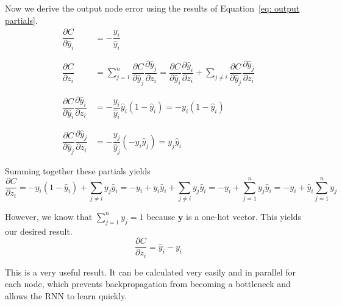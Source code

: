 \documentclass[pageno]{final_paper}
\begin{document}
Now we derive the output node error using the results of Equation~\eqref{eq: output partials}.
\begin{equation}
    \label{eq: loss function partial to h}
    \begin{aligned}
        \dfrac{\partial C}{\partial \hat{y}_i} &= -\dfrac{y_i}{\hat{y}_i} \\
        &\phantom{=} \\
        \dfrac{\partial C}{\partial z_i} &= \sum\limits_{j=1}^n \dfrac{\partial C}{\partial \hat{y}_j}\dfrac{\partial \hat{y}_j}{\partial z_i} =
            \dfrac{\partial C}{\partial \hat{y}_i}\dfrac{\partial \hat{y}_i}{\partial z_i} + \sum\limits_{j\neq i} \dfrac{\partial C}{\partial \hat{y}_j}\dfrac{\partial \hat{y}_j}{\partial z_i} \\
        &\phantom{=} \\
        \dfrac{\partial C}{\partial \hat{y}_i}\dfrac{\partial \hat{y}_i}{\partial z_i} &= -\dfrac{y_i}{\hat{y}_i} \hat{y}_i (1-\hat{y}_i) = -y_i(1-\hat{y}_i) \\
        &\phantom{=} \\
        \dfrac{\partial C}{\partial \hat{y}_j}\dfrac{\partial \hat{y}_j}{\partial z_i} &= -\dfrac{y_j}{\hat{y}_j} \left(-\hat{y}_i\hat{y}_j\right) = y_j\hat{y}_i
    \end{aligned}
\end{equation}

Summing together these partials yields
\begin{equation}
    \dfrac{\partial C}{\partial z_i} = -y_i(1-\hat{y}_i) + \sum\limits_{j\neq i} y_j\hat{y}_i =
        -y_i + y_i\hat{y}_i + \sum\limits_{j\neq i} y_j\hat{y}_i = -y_i + \sum\limits_{j = 1}^n y_j\hat{y}_i = -y_i + \hat{y}_i\sum\limits_{j=1}^n y_j
\end{equation}

However, we know that $\sum\limits_{j=1}^n y_j = 1$ because $\mathbf{y}$ is a one-hot vector. This
yields our desired result.
\begin{equation}
    \dfrac{\partial C}{\partial z_i} = \hat{y}_i - y_i
\end{equation}

This is a very useful result. It can be calculated very easily and in parallel
for each node, which prevents backpropagation from becoming a bottleneck and
allows the RNN to learn quickly.

\end{document}
